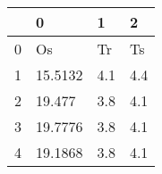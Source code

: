 \begin{tabular}{llll}
\toprule
{} &        0 &    1 &    2 \\
\midrule
0 &       Os &   Tr &   Ts \\
1 &  15.5132 &  4.1 &  4.4 \\
2 &   19.477 &  3.8 &  4.1 \\
3 &  19.7776 &  3.8 &  4.1 \\
4 &  19.1868 &  3.8 &  4.1 \\
\bottomrule
\end{tabular}

